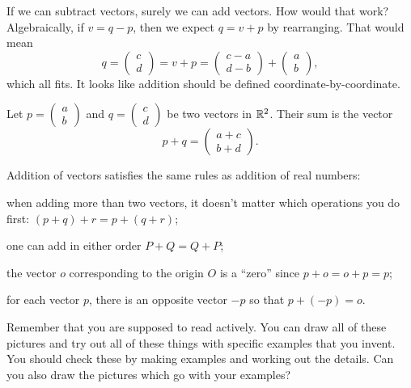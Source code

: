\documentclass[00-livre-main.tex]{subfiles}
\begin{document}
If we can subtract vectors, surely we can add vectors. How would that work? Algebraically, if $v=q-p$, then we expect $q=v+p$ by rearranging.
That would mean
\[
q = \begin{pmatrix} c \\ d \end{pmatrix} = v+p = \begin{pmatrix} c-a \\ d-b \end{pmatrix} + \begin{pmatrix} a \\ b \end{pmatrix},
\]
which all fits. It looks like addition should be defined coordinate-by-coordinate.

\begin{definition}
Let $p = \left(\begin{smallmatrix} a\\ b\end{smallmatrix}\right)$ and $q= \left(\begin{smallmatrix} c\\ d\end{smallmatrix}\right)$ be two vectors in $\mathbb{R}^2$. Their sum is the vector
\[
p+q = \begin{pmatrix} a+c \\ b+d\end{pmatrix}.
\]
\end{definition}

\begin{theorem}
Addition of vectors satisfies the same rules as addition of real numbers:
\begin{compactitem}
\item when adding more than two vectors, it doesn't matter which operations you do first:
$(p+q)+r = p + (q+r)$;
\item one can add in either order $P+Q = Q+P$;
\item the vector $o$ corresponding to the origin $O$ is a ``zero'' since $p+o = o+p = p$;
\item for each vector $p$, there is an opposite vector $-p$ so that $p + (-p) = o$.
\end{compactitem}
\end{theorem}

Remember that you are supposed to read actively.
You can draw all of these pictures and try out all of these things with specific examples that you invent.
You should check these by making examples and working out the details.
Can you also draw the pictures which go with your examples?
\end{document}
